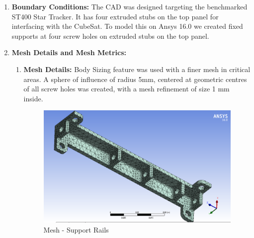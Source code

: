 \documentclass[../../main.tex]{subfiles}
\begin{document}
\begin{enumerate}
\begin{enumerate}
            \item \textbf{Boundary Conditions: }The CAD was designed targeting the benchmarked ST400 Star Tracker. It has four extruded stubs on the top panel for interfacing with the CubeSat. To model this on Ansys 16.0 we created fixed supports at four screw holes on extruded stubs on the top panel.
            \item \textbf{Mesh Details and Mesh Metrics:}
            \begin{enumerate}
                \item \textbf{Mesh Details:} Body Sizing feature was used with a finer mesh in critical areas. A sphere of influence of radius 5mm, centered at geometric centres of all screw holes was created, with a mesh refinement of size 1 mm inside.\newline
                \newline
                \newline
                \begin{figure}[H]
                    \centering
                    \includegraphics[scale=0.45]{Figures/Mechanical/Support Rail Mesh.PNG}
                    \caption{Mesh - Support Rails}
                    \label{fig:sys_CAD}
                \end{figure}
                \begin{figure}[H]
                    \centering

\end{figure}
\end{enumerate}
\end{enumerate}
\end{enumerate}
\end{document}
